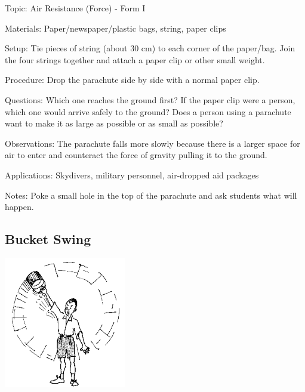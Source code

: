 \begin{multicols}{2}
\begin{description*}
\item[Topic:]{Air Resistance (Force) - Form I}
\item[Materials:]{Paper/newspaper/plastic bags, string, paper clips}
\item[Setup:]{Tie pieces of string (about 30 cm) to each corner of the paper/bag. Join the four strings together and attach a paper clip or other small weight.}
\item[Procedure:]{Drop the parachute side by side with a normal paper clip.}
\item[Questions:]{Which one reaches the ground first? If the paper clip were a person, which one would arrive safely to the ground? Does a person using a parachute want to make it as large as possible or as small as possible?}
\item[Observations:]{The parachute falls more slowly because there is a larger space for air to enter and counteract the force of gravity pulling it to the ground.}
\item[Applications:]{Skydivers, military personnel, air-dropped aid packages}
\item[Notes:]{Poke a small hole in the top of the parachute and ask students what will happen.}
\end{description*}

\subsection{Bucket Swing}

\begin{center}
\includegraphics[width=0.4\textwidth]{./img/source/bucket-swing.png}
\end{center}


\end{multicols}
